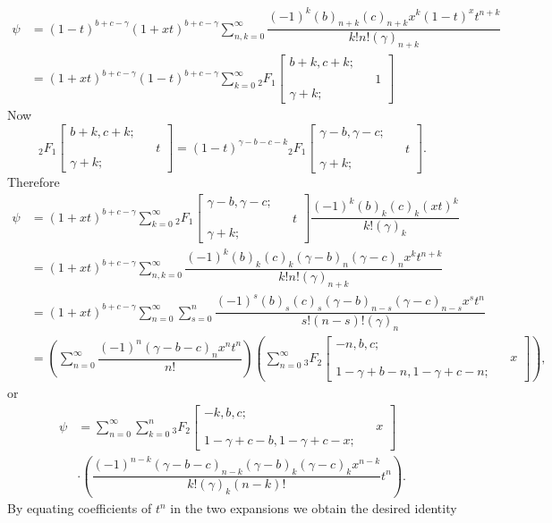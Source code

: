 \begin{solution}
$$\begin{array}{ll}
\psi &= (1-t)^{b+c-\gamma}(1+xt)^{b+c-\gamma} \displaystyle\sum_{n,k=0}^{\infty} \dfrac{(-1)^k (b)_{n+k} (c)_{n+k} x^k (1-t)^x t^{n+k}}{k! n! (\gamma)_{n+k}} \\
&= (1+xt)^{b+c-\gamma} (1-t)^{b+c-\gamma} \displaystyle\sum_{k=0}^{\infty} {}_2F_1 \left[ \begin{array}{rlr}
b+k, c+k; & & \\
& & 1 \\
\gamma + k; & &
\end{array} \right]
\end{array}$$
Now
$${}_2F_1 \left[ \begin{array}{rlr}
b+k, c+k; & & \\
& & t \\
\gamma + k; & &
\end{array} \right] = (1-t)^{\gamma -b -c -k} {}_2F_1 \left[ \begin{array}{rlr}
\gamma-b, \gamma-c; & & \\
& & t \\
\gamma + k; & &
\end{array} \right].$$
Therefore
$$\begin{array}{ll}
\psi &= (1+xt)^{b+c-\gamma} \displaystyle\sum_{k=0}^{\infty} {}_2F_1 \left[ \begin{array}{rlr}
\gamma -b, \gamma-c ; & & \\
& & t \\
\gamma + k; & &
\end{array} \right] \dfrac{(-1)^k (b)_k (c)_k (xt)^k}{k! (\gamma)_k} \\
&= (1+xt)^{b+c-\gamma} \displaystyle\sum_{n,k=0}^{\infty} \dfrac{(-1)^k (b)_k (c)_k (\gamma-b)_n (\gamma-c)_n x^k t^{n+k}}{k! n! (\gamma)_{n+k}} \\
&= (1+xt)^{b+c-\gamma} \displaystyle\sum_{n=0}^{\infty} \displaystyle\sum_{s=0}^n \dfrac{(-1)^s (b)_s (c)_s (\gamma-b)_{n-s} (\gamma-c)_{n-s}x^st^n}{s! (n-s)! (\gamma)_n} \\
&=\!\left(\!\displaystyle\sum_{n=0}^{\infty}\!\dfrac{(-1)^n\!(\!\gamma\!-\!b\!-\!c\!)_n x^n\!t^n}{n!}\!\right)\!\!\left(\!\displaystyle\sum_{n=0}^{\infty}\!{}_3F_2\!\left[\!\begin{array}{rlr}
-n, b, c; & & \\
& & x \\
\!1\!-\!\gamma\!+\!b\!-\!n\!,\!1\!-\!\gamma\!+\!c\!-\!n; & &
\end{array} \right] \right),
\end{array}$$
or
\begin{eqnarray*}
\psi &= \displaystyle\sum_{n=0}^{\infty} \displaystyle\sum_{k=0}^n {}_3F_2 \left[ \begin{array}{rlr}
-k, b,c; & & \\
& & x \\
1-\gamma+c-b, 1-\gamma+c-x; & &
\end{array} \right] \\ 
& \cdot \left( \dfrac{(-1)^{n-k} (\gamma-b-c)_{n-k} (\gamma-b)_k (\gamma-c)_k x^{n-k}}{k! (\gamma)_k (n-k)!}t^n \right).
\end{eqnarray*}
By equating coefficients of $t^n$ in the two expansions we obtain the desired identity
\end{solution}
